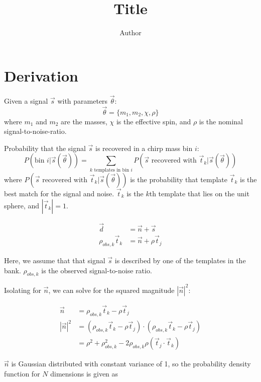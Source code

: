 \documentclass[12pt]{article}
\title{Title}
\author{Author}
\date{}
\newcommand{\ptjtk}{\rho(\vec{t}_j\cdot\vec{t}_k)}
\begin{document}
\maketitle

\section{Derivation}

Given a signal $\vec{s}$ with parameters $\vec\theta$:
   \begin{equation}
   \vec\theta = \{m_1,m_2,\chi,\rho\}
   \end{equation}
where $m_1$ and $m_2$ are the masses, $\chi$ is the effective spin, and $\rho$ is the nominal signal-to-noise-ratio.

Probability that the signal $\vec{s}$ is recovered in a chirp mass bin $i$:
   \begin{equation}
   P(\text{bin $i$} | \vec{s}(\vec\theta)) = \sum_{\text{$k$ templates in bin $i$}} P(\text{$\vec{s}$ recovered with $\vec{t}_k$}|\vec{s}(\vec\theta))
   \end{equation}
where $P(\text{$\vec{s}$ recovered with $\vec{t}_k$}|\vec{s}(\vec\theta))$ is the probability that template $\vec{t}_k$ is the best match for the signal and noise. $\vec{t}_k$ is the $k$th template that lies on the unit sphere, and $|\vec{t}_k| = 1$.

   \begin{align}
   \vec{d} &= \vec{n} + \vec{s} \\
   \rho_{obs,k}\vec{t}_k &= \vec{n} + \rho\vec{t}_j
   \end{align}

Here, we assume that that signal $\vec{s}$ is described by one of the templates in the bank. $\rho_{obs,k}$ is the observed signal-to-noise ratio.

Isolating for $\vec{n}$, we can solve for the squared magnitude $|\vec{n}|^2$:

   \begin{align}
   \vec{n} &= \rho_{obs,k}\vec{t}_k - \rho\vec{t}_j \\
   |\vec{n}|^2 &= (\rho_{obs,k}\vec{t}_k - \rho\vec{t}_j) \cdot (\rho_{obs,k}\vec{t}_k - \rho\vec{t}_j)\\
               &= \rho^2 + \rho_{obs,k}^2 - 2\rho_{obs,k}\ptjtk
   \label{eqn:n_squaredmagnitude}
   \end{align}
   
$\vec{n}$ is Gaussian distributed with constant variance of 1, so the probability density function for $N$ dimensions is given as
\end{document}
